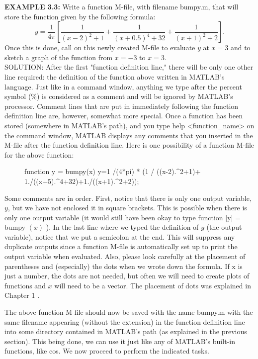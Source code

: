 \documentclass[../main.tex]{subfiles}
\begin{document}
\textbf{EXAMPLE 3.3:} Write a function M-file, with filename bumpy.m, that will store the function given by the following formula:
$$
y=\frac{1}{4 \pi}\left[\frac{1}{(x-2)^{2}+1}+\frac{1}{(x+0.5)^{4}+32}+\frac{1}{(x+1)^{2}+2}\right] \text {.}
$$
Once this is done, call on this newly created M-file to evaluate $y$ at $x=3$ and to sketch a graph of the function from $x=-3$ to $x=3$.\\

 SOLUTION: After the first "function definition line," there will be only one other line required: the definition of the function above written in MATLAB's language. Just like in a command window, anything we type after the percent symbol (\%) is considered as a comment and will be ignored by MATLAB's processor. Comment lines that are put in immediately following the function definition line are, however, somewhat more special. Once a function has been stored (somewhere in MATLAB's path), and you type help <function\_name> on the command window, MATLAB displays any comments that you inserted in the M-file after the function definition line. Here is one possibility of a function M-file for the above function:

\begin{figure}[H]
\centering
\begin{boxedverbatim}
function y = bumpy(x) 
y=1 /(4*pi) * (1 / ((x-2).^2+1)+ 1./((x+5).^4+32)+1./((x+1).^2+2));
\end{boxedverbatim}
\end{figure}

Some comments are in order. First, notice that there is only one output variable, $y$, but we have not enclosed it in square brackets. This is possible when there is only one output variable (it would still have been okay to type function [y] = bumpy $(x)$ ). In the last line where we typed the definition of $y$ (the output variable), notice that we put a semicolon at the end. This will suppress any duplicate outputs since a function M-file is automatically set up to print the output variable when evaluated. Also, please look carefully at the placement of parentheses and (especially) the dots when we wrote down the formula. If $\mathrm{x}$ is just a number, the dots are not needed, but often we will need to create plots of functions and $x$ will need to be a vector. The placement of dots was explained in Chapter 1 .

The above function M-file should now be saved with the name bumpy.m with the same filename appearing (without the extension) in the function definition line into some directory contained in MATLAB's path (as explained in the previous section). This being done, we can use it just like any of MATLAB's built-in functions, like cos. We now proceed to perform the indicated tasks.
\end{document}
